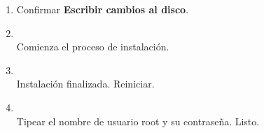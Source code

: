 \documentclass[11pt]{article}
\begin{document}
\begin{enumerate}
			\item Confirmar \textbf{Escribir cambios al disco}.

			\item 
				\begin{minipage}[t]{\linewidth}
			        \raggedright
			        \medskip
			        \\Comienza el proceso de instalación. 
		        \end{minipage}	

		    \item 
		    	\begin{minipage}[t]{\linewidth}
			        \raggedright
			        \medskip
			        \\Instalación finalizada. Reiniciar. 
		        \end{minipage}	

		   	\item 
		   		\begin{minipage}[t]{\linewidth}
			        \raggedright
			        \medskip
			        \\Tipear el nombre de usuario root y su contraseña. Listo. 
		        \end{minipage}	


\end{enumerate}
\end{document}
